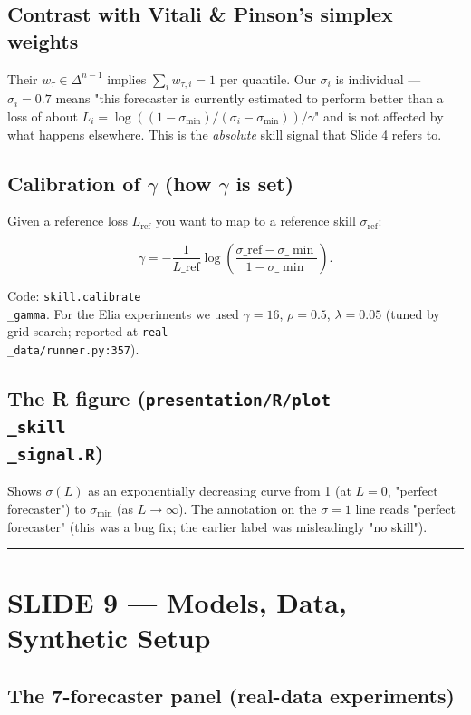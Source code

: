 \documentclass[11pt]{article}
\begin{document}
\subsection{Contrast with Vitali \& Pinson's simplex weights}


Their $w_{\tau} \in \Delta^{n-1}$ implies $\sum_i w_{\tau,i} = 1$ per quantile. Our $\sigma_i$ is individual --- $\sigma_i = 0.7$ means "this forecaster is currently estimated to perform better than a loss of about $L_i = \log((1 - \sigma_{\min})/(\sigma_i - \sigma_{\min}))/\gamma$" and is not affected by what happens elsewhere. This is the \emph{absolute} skill signal that Slide 4 refers to.

\subsection{Calibration of $\gamma$ (how $\gamma$ is set)}


Given a reference loss $L_{\text{ref}}$ you want to map to a reference skill $\sigma_{\text{ref}}$:

$$
\gamma = -\frac{1}{L\_{\text{ref}}} \log\!\left( \frac{\sigma\_{\text{ref}} - \sigma\_{\min}}{1 - \sigma\_{\min}} \right).
$$

Code: \texttt{skill.calibrate\\_gamma}. For the Elia experiments we used $\gamma = 16$, $\rho = 0.5$, $\lambda = 0.05$ (tuned by grid search; reported at \texttt{real\\_data/runner.py:357}).

\subsection{The R figure (\texttt{presentation/R/plot\\_skill\\_signal.R})}


Shows $\sigma(L)$ as an exponentially decreasing curve from 1 (at $L = 0$, "perfect forecaster") to $\sigma_{\min}$ (as $L \to \infty$). The annotation on the $\sigma = 1$ line reads "perfect forecaster" (this was a bug fix; the earlier label was misleadingly "no skill").

\bigskip\hrule\bigskip

\section{SLIDE 9 --- Models, Data, Synthetic Setup}


\subsection{The 7-forecaster panel (real-data experiments)}
\end{document}
